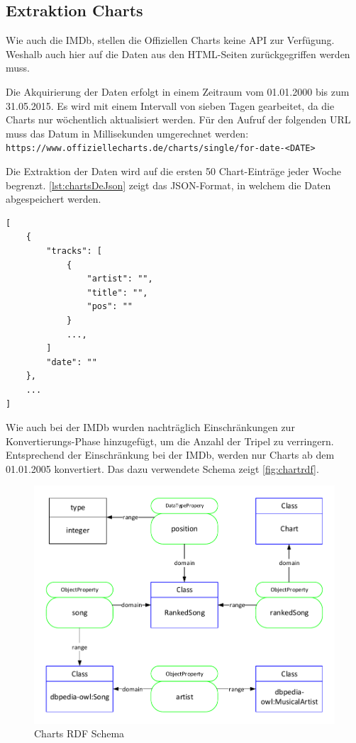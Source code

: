 \documentclass[parskip]{scrartcl}
\begin{document}
\subsection{Extraktion Charts}

Wie auch die IMDb, stellen die Offiziellen Charts keine API zur Verfügung. Weshalb auch hier auf die Daten aus den HTML-Seiten zurückgegriffen werden muss.

Die Akquirierung der Daten erfolgt in einem Zeitraum vom 01.01.2000 bis zum 31.05.2015. Es wird mit einem Intervall von sieben Tagen gearbeitet, da die Charts nur wöchentlich aktualisiert werden. Für den Aufruf der folgenden URL muss das Datum in Millisekunden umgerechnet werden:\\
\texttt{https://www.offiziellecharts.de/charts/single/for-date-<DATE>}

Die Extraktion der Daten wird auf die ersten 50 Chart-Einträge jeder Woche begrenzt. \autoref{lst:chartsDeJson} zeigt das JSON-Format, in welchem die Daten abgespeichert werden.

\begin{lstlisting}[caption={Offizielle Charts JSON-Format}, label={lst:chartsDeJson}]
[  
    {
        "tracks": [
            {
                "artist": "",
                "title": "",
                "pos": ""
            }
            ...,
        ]
        "date": ""
    },
    ...
]
\end{lstlisting}

Wie auch bei der IMDb wurden nachträglich Einschränkungen zur Konvertierungs-Phase hinzugefügt, um die Anzahl der Tripel zu verringern. Entsprechend der Einschränkung bei der IMDb, werden nur Charts ab dem 01.01.2005 konvertiert. Das dazu verwendete Schema zeigt \autoref{fig:chartrdf}.

\begin{figure}[H]
    \centering
    \includegraphics[scale=0.8]{charts}
    \caption{Charts RDF Schema}
    \label{fig:chartrdf}
\end{figure}
\end{document}
